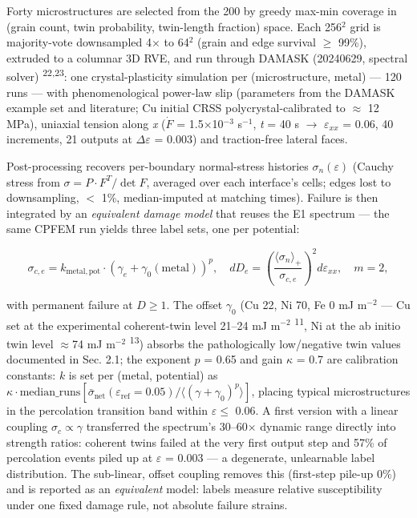 \documentclass[11pt]{article}
\begin{document}
Forty microstructures are selected from the 200 by greedy max-min coverage in (grain count, twin probability, twin-length fraction) space. Each 256$^{2}$ grid is majority-vote downsampled 4$\times$ to 64$^{2}$ (grain and edge survival $\ge$ 99\%), extruded to a columnar 3D RVE, and run through DAMASK (20240629, spectral solver) \textsuperscript{22,23}: one crystal-plasticity simulation per (microstructure, metal) --- 120 runs --- with phenomenological power-law slip (parameters from the DAMASK example set and literature; Cu initial CRSS polycrystal-calibrated to $\approx$ 12 MPa), uniaxial tension along \textit{x} ($\dot F$ = 1.5$\times$10$^{-3}$ s$^{-1}$, \textit{t} = 40 s $\rightarrow$ $\varepsilon_{xx}$ = 0.06, 40 increments, 21 outputs at $\Delta\varepsilon$ = 0.003) and traction-free lateral faces.

Post-processing recovers per-boundary normal-stress histories $\sigma_n(\varepsilon)$ (Cauchy stress from $\sigma = P\cdot F^{T}/\det F$, averaged over each interface's cells; edges lost to downsampling, $<$ 1\%, median-imputed at matching times). Failure is then integrated by an \textit{equivalent damage model} that reuses the E1 spectrum --- the same CPFEM run yields three label sets, one per potential:

\[
\sigma_{c,e} = k_{\mathrm{metal,pot}} \cdot \left(\gamma_e + \gamma_0(\mathrm{metal})\right)^{p}, \quad
dD_e = \left(\frac{\langle\sigma_n\rangle_{+}}{\sigma_{c,e}}\right)^{2} d\varepsilon_{xx}, \quad m = 2,
\]

with permanent failure at $D \ge 1$. The offset $\gamma_0$ (Cu 22, Ni 70, Fe 0 mJ m$^{-2}$ --- Cu set at the experimental coherent-twin level 21--24 mJ m$^{-2}$ \textsuperscript{11}, Ni at the ab initio twin level $\approx$74 mJ m$^{-2}$ \textsuperscript{13}) absorbs the pathologically low/negative twin values documented in Sec. 2.1; the exponent $p$ = 0.65 and gain $\kappa$ = 0.7 are calibration constants: $k$ is set per (metal, potential) as $\kappa \cdot \mathrm{median\_runs}[\bar{\sigma}_{\mathrm{net}}(\varepsilon_{\mathrm{ref}} = 0.05) / \langle(\gamma+\gamma_0)^{p}\rangle]$, placing typical microstructures in the percolation transition band within $\varepsilon \le$ 0.06. A first version with a linear coupling $\sigma_{c} \propto \gamma$ transferred the spectrum's 30--60$\times$ dynamic range directly into strength ratios: coherent twins failed at the very first output step and 57\% of percolation events piled up at $\varepsilon$ = 0.003 --- a degenerate, unlearnable label distribution. The sub-linear, offset coupling removes this (first-step pile-up 0\%) and is reported as an \textit{equivalent} model: labels measure relative susceptibility under one fixed damage rule, not absolute failure strains.
\end{document}
